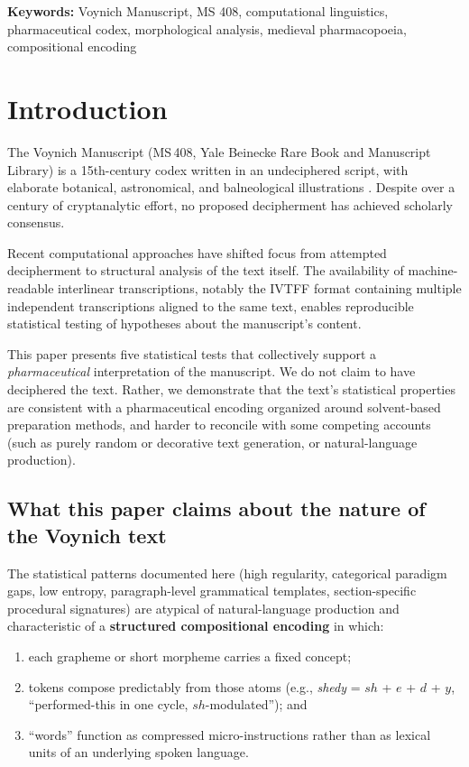\documentclass[11pt,a4paper]{article}
\begin{document}
\textbf{Keywords:} Voynich Manuscript, MS 408, computational linguistics, pharmaceutical codex, morphological analysis, medieval pharmacopoeia, compositional encoding

\section{Introduction}

The Voynich Manuscript (MS\,408, Yale Beinecke Rare Book and Manuscript Library) is a 15th-century codex written in an undeciphered script, with elaborate botanical, astronomical, and balneological illustrations \citep{DImperio1978}. Despite over a century of cryptanalytic effort, no proposed decipherment has achieved scholarly consensus.

Recent computational approaches have shifted focus from attempted decipherment to structural analysis of the text itself. The availability of machine-readable interlinear transcriptions, notably the IVTFF format containing multiple independent transcriptions aligned to the same text, enables reproducible statistical testing of hypotheses about the manuscript's content.

This paper presents five statistical tests that collectively support a \textit{pharmaceutical} interpretation of the manuscript. We do not claim to have deciphered the text. Rather, we demonstrate that the text's statistical properties are consistent with a pharmaceutical encoding organized around solvent-based preparation methods, and harder to reconcile with some competing accounts (such as purely random or decorative text generation, or natural-language production).

\subsection{What this paper claims about the nature of the Voynich text}

The statistical patterns documented here (high regularity, categorical paradigm gaps, low entropy, paragraph-level grammatical templates, section-specific procedural signatures) are atypical of natural-language production and characteristic of a \textbf{structured compositional encoding} in which:

\begin{enumerate}[leftmargin=*,itemsep=2pt]
\item each grapheme or short morpheme carries a fixed concept;
\item tokens compose predictably from those atoms (e.g., \textit{shedy} = $sh$ + $e$ + $d$ + $y$, ``performed-this in one cycle, $sh$-modulated''); and
\item ``words'' function as compressed micro-instructions rather than as lexical units of an underlying spoken language.
\end{enumerate}
\end{document}
